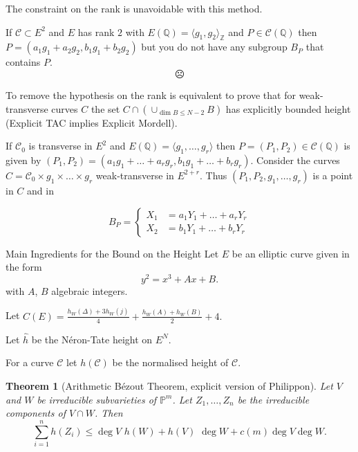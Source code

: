 \documentclass[handout]{beamer}
\newcommand{\qe}{\mathbb{Q}}
\newcommand{\Ci}{\mathcal{C}}
\newtheorem{thm}{Theorem}
\begin{document}
\begin{frame}




\begin{alertblock}{The constraint on the rank is unavoidable with this method.}

If $\Ci\subset E^2$ and $E$ has  rank $2$ with $E(\qe)=\langle g_1, g_2\rangle_\mathbb{Z}$ and  $P\in \Ci(\qe)$ then $P=(a_1g_1+a_2g_2, b_1g_1+b_2g_2)$ but you do not have any subgroup $B_P$ that contains $P$. {\Huge $${\frownie}$$}

To remove the hypothesis on the rank is equivalent to prove that for weak-transverse curves $C$ the set $C \cap \left( \cup_{\dim B\le N-2} B \right)$ has  explicitly bounded height (Explicit TAC implies Explicit Mordell).

If $\Ci_0$ is transverse in $E^2$ and $E(\qe)=\langle g_1,\dots, g_r\rangle $ then $P=(P_1,P_2)\in \Ci(\qe) $ is given by $(P_1,P_2)=(a_1g_1+\dots +a_r g_r, b_1g_1+\dots +b_rg_r)$. Consider the curves $C=\Ci_0\times g_1 \times \dots \times g_r $ weak-transverse in $E^{2+r}$.   Thus $(P_1,P_2, g_1,\dots,g_r)$ is a point in  $C$ and in 

$$B_P=\begin{cases}X_1&=a_1 Y_1+\dots +a_rY_r\\X_2&=b_1 Y_1+\dots +b_rY_r
\end{cases} $$

\end{alertblock}


\end{frame}



\begin{frame}{Main Ingredients for the  Bound on the  Height}
Let $E$ be an elliptic curve  given in the form
\begin{equation*}\label{uno}y^2=x^3+Ax+B.\end{equation*}
with $A$, $B$ algebraic integers.

Let $C(E)=\frac{h_W(\Delta)+3h_W(j)}{4}+\frac{h_W(A)+h_W(B)}{2}+4.$

Let  $\hat{h}$ be the N\'eron-Tate height  on $E^N$. 

 For a curve $\Ci$ let $h(\Ci)$ be the normalised height of $\Ci$.
 \pause
 
\begin{thm}[Arithmetic B\'ezout Theorem, explicit version of Philippon] Let $V$ and $W$ be irreducible subvarieties of $\mathbb{P}^m$. Let $Z_1, \dots , Z_n$ be the irreducible components of $V\cap W$. Then 
$$ \sum_{i=1}^n h(Z_i)\le\deg V \,\,h(W) +h(V) \,\, \deg  W +c(m) \deg V\deg W.$$
\end{thm}
\end{frame}
\end{document}
